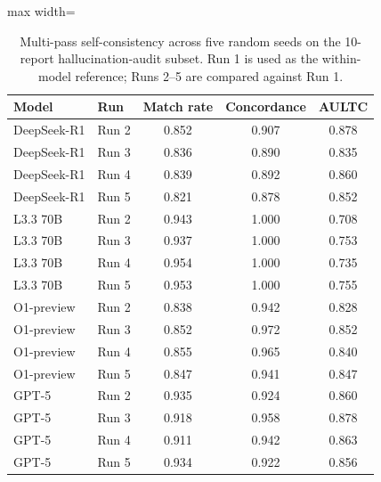 \begin{table}[htbp]
\ChSixUseRaggedCaption
\caption{Multi-pass self-consistency across five random seeds on the 10-report hallucination-audit subset. Run 1 is used as the within-model reference; Runs 2--5 are compared against Run 1.}
\ChSixTableBodyStart
\begin{ChSixFloatBody}

\centering
\small


\begin{adjustbox}{max width=\textwidth}
\begin{tabular}{llccc}
\toprule
Model & Run & Match rate & Concordance & AULTC \\
\midrule
DeepSeek-R1 & Run 2 & 0.852 & 0.907 & 0.878 \\
DeepSeek-R1 & Run 3 & 0.836 & 0.890 & 0.835 \\
DeepSeek-R1 & Run 4 & 0.839 & 0.892 & 0.860 \\
DeepSeek-R1 & Run 5 & 0.821 & 0.878 & 0.852 \\
\midrule
L3.3 70B & Run 2 & 0.943 & 1.000 & 0.708 \\
L3.3 70B & Run 3 & 0.937 & 1.000 & 0.753 \\
L3.3 70B & Run 4 & 0.954 & 1.000 & 0.735 \\
L3.3 70B & Run 5 & 0.953 & 1.000 & 0.755 \\
\midrule
O1-preview & Run 2 & 0.838 & 0.942 & 0.828 \\
O1-preview & Run 3 & 0.852 & 0.972 & 0.852 \\
O1-preview & Run 4 & 0.855 & 0.965 & 0.840 \\
O1-preview & Run 5 & 0.847 & 0.941 & 0.847 \\
\midrule
GPT-5 & Run 2 & 0.935 & 0.924 & 0.860 \\
GPT-5 & Run 3 & 0.918 & 0.958 & 0.878 \\
GPT-5 & Run 4 & 0.911 & 0.942 & 0.863 \\
GPT-5 & Run 5 & 0.934 & 0.922 & 0.856 \\
\bottomrule
\end{tabular}
\end{adjustbox}

\end{ChSixFloatBody}
\end{table}
